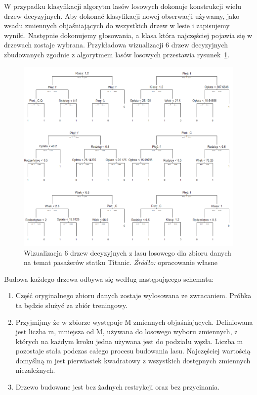\documentclass[12pt,a4paper,twoside,openany]{book}
\begin{document}
W przypadku klasyfikacji algorytm lasów losowych dokonuje konstrukcji wielu drzew decyzyjnych. Aby dokonać klasyfikacji nowej obserwacji używamy, jako wsadu zmiennych objaśniających do wszystkich drzew w lesie i zapisujemy wyniki. Następnie dokonujemy głosowania, a klasa która najczęściej pojawia się w drzewach zostaje wybrana. Przykładowa wizualizacji 6 drzew decyzyjnych zbudowanych zgodnie z algorytmem lasów losowych przestawia rysunek~\ref{rys001a}.

\begin{figure}
\centering
\includegraphics[scale=0.7]{./rys001a}
\caption{Wizualizacja 6 drzew decyzyjnych z lasu losowego dla zbioru danych na temat pasażerów statku Titanic. \textit{Źródło:} opracowanie własne}\label{rys001a}
\end{figure}


Budowa każdego drzewa odbywa się według następującego schematu:
\begin{enumerate}
\item Część oryginalnego zbioru danych zostaje wylosowana ze zwracaniem. Próbka ta będzie służyć za zbiór treningowy.
\item Przyjmijmy że w zbiorze występuje M zmiennych objaśniających. Definiowana jest liczba m, mniejsza od M, używana do losowego wyboru zmiennych, z których na każdym kroku jedna używana jest do podziału węzła. Liczba m pozostaje stała podczas całego procesu budowania lasu. Najczęściej wartością domyślną m jest pierwiastek kwadratowy z wszystkich dostępnych zmiennych niezależnych.
\item Drzewo budowane jest bez żadnych restrykcji oraz bez przycinania.
\end{enumerate}
\end{document}

